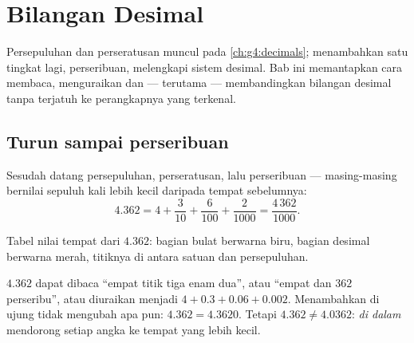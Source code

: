 \chapter{Bilangan Desimal}\label{ch:g5:decimals}

Persepuluhan dan perseratusan muncul pada \cref{ch:g4:decimals};
menambahkan satu tingkat lagi, perseribuan, melengkapi sistem
desimal. Bab ini memantapkan cara membaca, menguraikan dan ---
terutama --- membandingkan bilangan desimal tanpa terjatuh ke
perangkapnya yang terkenal.

\section{Turun sampai perseribuan}

\begin{definition}\label{def:g5:decimals:places}
Sesudah  datang persepuluhan, perseratusan, lalu
perseribuan --- masing-masing bernilai sepuluh kali lebih kecil
daripada tempat sebelumnya:
\[
4.362 = 4 + \frac{3}{10} + \frac{6}{100} + \frac{2}{1000}
= \frac{4\,362}{1000}.
\]
\end{definition}

\begin{omfigure}

{\small Tabel nilai tempat dari $4.362$: bagian bulat berwarna biru,
bagian desimal berwarna merah, titiknya di antara satuan dan persepuluhan.}
\end{omfigure}

\begin{example}\label{ex:g5:decimals:readings}
$4.362$ dapat dibaca ``empat titik tiga enam dua'', atau ``empat dan
$362$ perseribu'', atau diuraikan menjadi $4 + 0.3 + 0.06 + 0.002$.
Menambahkan  di ujung tidak mengubah apa pun: $4.362 = 4.3620$.
Tetapi $4.362 \neq 4.0362$:  \emph{di dalam} mendorong setiap
angka ke tempat yang lebih kecil.
\end{example}

